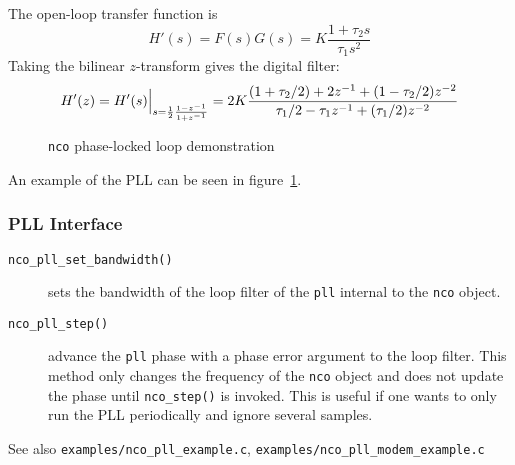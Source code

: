 The open-loop transfer function is
\[
    H'(s) = F(s)G(s) = K \frac{1 + \tau_2 s}{\tau_1 s^2}
\]
Taking the bilinear $z$-transform gives the digital filter:
\[
    H'(z) = H'(s)\Bigl.\Bigr|_{s = \frac{1}{2}\frac{1-z^{-1}}{1+z^{-1}}}
          = 2 K \frac{
                (1+\tau_2/2) + 2 z^{-1}     + ( 1 - \tau_2/2)z^{-2}
          } {
                \tau_1/2 -\tau_1 z^{-1} + (\tau_1/2)z^{-2}
          }
\]

\begin{figure}
\centering
{}
\caption{{\tt nco} phase-locked loop demonstration}
\label{fig:module:nco:pll}
\end{figure}

An example of the PLL can be seen in figure~\ref{fig:module:nco:pll}.

\subsubsection{PLL Interface}
\begin{description}
\item[{\tt nco\_pll\_set\_bandwidth()}]
    sets the bandwidth of the loop filter of the {\tt pll} internal to the
    {\tt nco} object.
\item[{\tt nco\_pll\_step()}]
    advance the {\tt pll} phase with a phase error argument to the loop
    filter.
    This method only changes the frequency of the {\tt nco} object and does
    not update the phase until {\tt nco\_step()} is invoked.
    This is useful if one wants to only run the PLL periodically and ignore
    several samples.
\end{description}

See also
{\tt examples/nco\_pll\_example.c},
{\tt examples/nco\_pll\_modem\_example.c}

